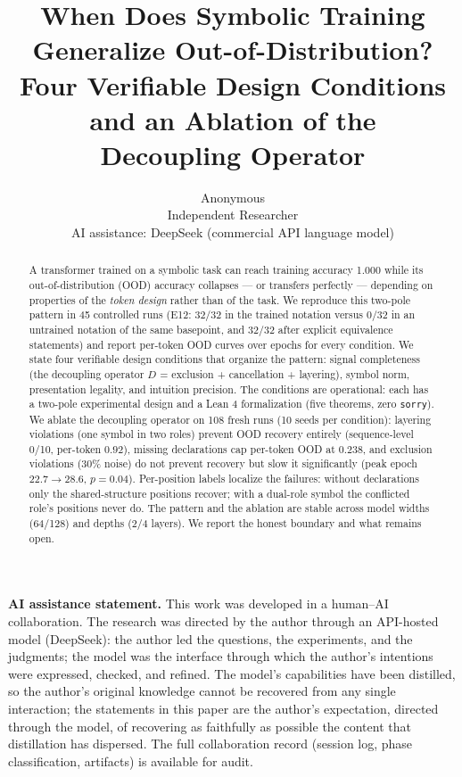 \documentclass{article} %
\title{When Does Symbolic Training Generalize Out-of-Distribution?\\
Four Verifiable Design Conditions and an Ablation of the\\
Decoupling Operator}
\author{Anonymous\\
\small Independent Researcher\\
\small AI assistance: DeepSeek (commercial API language model)}
\begin{document}
\maketitle

\noindent\textbf{AI assistance statement.} This work was developed
in a human--AI collaboration. The research was directed by the
author through an API-hosted model (DeepSeek): the author led the
questions, the experiments, and the judgments; the model was the
interface through which the author's intentions were expressed,
checked, and refined. The model's capabilities have been distilled,
so the author's original knowledge cannot be recovered from any
single interaction; the statements in this paper are the author's
expectation, directed through the model, of recovering as
faithfully as possible the content that distillation has dispersed.
The full collaboration record (session log, phase classification,
artifacts) is available for audit.

\begin{abstract}
A transformer trained on a symbolic task can reach training
accuracy 1.000 while its out-of-distribution (OOD) accuracy
collapses --- or transfers perfectly --- depending on properties of
the \emph{token design} rather than of the task. We reproduce this
two-pole pattern in 45 controlled runs (E12: $32/32$ in the trained
notation versus $0/32$ in an untrained notation of the same
basepoint, and $32/32$ after explicit equivalence statements) and
report per-token OOD curves over epochs for every condition. We
state four verifiable design conditions that organize the pattern:
signal completeness (the decoupling operator $D$ = exclusion +
cancellation + layering), symbol norm, presentation legality, and
intuition precision. The conditions are operational: each has a
two-pole experimental design and a Lean 4 formalization (five
theorems, zero \texttt{sorry}). We ablate the decoupling operator
on 108 fresh runs (10 seeds per condition): layering violations
(one symbol in two roles) prevent OOD recovery entirely
(sequence-level 0/10, per-token $0.92$), missing declarations cap
per-token OOD at $0.238$, and exclusion violations (30\% noise) do
not prevent recovery but slow it significantly (peak epoch $22.7
\to 28.6$, $p = 0.04$). Per-position labels localize the failures:
without declarations only the shared-structure positions recover;
with a dual-role symbol the conflicted role's positions never do.
The pattern and the ablation are stable across model widths
(64/128) and depths (2/4 layers). We report the honest boundary and
what remains open.
\end{abstract}
\end{document}
